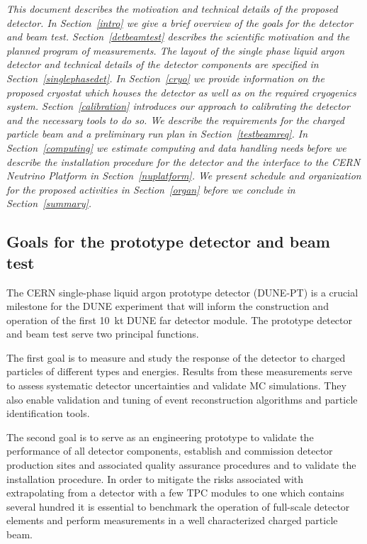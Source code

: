 
{\it 
This document describes the motivation and technical details of the proposed detector. 
In Section~\ref{intro} we give a brief overview of the goals for the detector and beam test.
Section~\ref{detbeamtest} describes the scientific motivation and the planned program of measurements. The layout of the single phase liquid argon detector and technical details of the detector components are specified in Section~\ref{singlephasedet}. In Section~\ref{cryo} we provide information on the proposed cryostat which houses the detector as well as on the required cryogenics system. Section~\ref{calibration} introduces our approach to calibrating the detector and the necessary tools to do so. We describe the requirements for the charged particle beam and a preliminary run plan in Section~\ref{testbeamreq}.
In Section~\ref{computing} we estimate computing and data handling needs before we describe the installation procedure for the detector
and the interface to the CERN Neutrino Platform in Section~\ref{nuplatform}. We present schedule and organization for the proposed activities in Section~\ref{organ} before we conclude in Section~\ref{summary}.}

\label{intro}


\subsection{Goals for the prototype detector and beam test}

The CERN single-phase liquid argon prototype detector (DUNE-PT) is a crucial milestone for the DUNE experiment that will inform the construction and operation of the first 10~kt DUNE far detector module.  The prototype detector and beam test serve two principal functions. 

The first goal is 
to measure and study the response of the detector to charged particles of different types and energies. 
Results from these measurements serve to assess systematic detector uncertainties and
validate MC simulations. They also enable validation and tuning of event reconstruction algorithms and particle identification tools.

The second goal is 
to serve as an engineering prototype to validate the performance of all detector components,
establish and commission detector production sites and associated quality assurance procedures and to validate the installation procedure. 
%
In order to mitigate the risks associated with extrapolating 
from a detector with a few TPC modules to one which contains several hundred 
 it is essential to benchmark the operation of full-scale detector elements
and perform measurements in a well characterized charged particle beam.  

